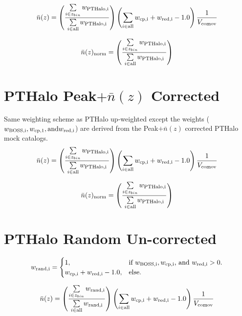 \documentclass[letterpaper]{article}
\begin{document}
\begin{equation}
\bar{n}(z) = \left(\frac{\sum\limits_{i \in z_{bin}} w_{\rm{PTHalo},i} }{\sum\limits_{i \in \rm{all}} w_{\rm{PTHalo},i} } \right) \left(\sum\limits_{i \in \rm{all}} w_{\rm{cp},i} + w_{\rm{red},i}-1.0 \right) \frac{1}{V_{\rm{comov}}}
\end{equation}

\begin{equation}
\bar{n}(z)_{\rm{norm}} = \left(\frac{\sum\limits_{i \in z_{bin}} w_{\rm{PTHalo},i} }{\sum\limits_{i \in \rm{all}} w_{\rm{PTHalo},i} } \right)
\end{equation}

\section{PTHalo Peak$+\bar{n}(z)$ Corrected}
\noindent Same weighting scheme as PTHalo up-weighted except the weights ($w_{\rm{BOSS},i}, w_{\rm{cp},1}, \text{and} w_{\rm{red},i}$) are derived from the Peak$+\bar{n}(z)$ corrected PTHalo mock catalogs. 
\begin{equation}
\bar{n}(z) = \left(\frac{\sum\limits_{i \in z_{bin}} w_{\rm{PTHalo},i} }{\sum\limits_{i \in \rm{all}} w_{\rm{PTHalo},i} } \right) \left(\sum\limits_{i \in \rm{all}} w_{\rm{cp},i} + w_{\rm{red},i}-1.0 \right) \frac{1}{V_{\rm{comov}}}
\end{equation}

\begin{equation}
\bar{n}(z)_{\rm{norm}} = \left(\frac{\sum\limits_{i \in z_{bin}} w_{\rm{PTHalo},i} }{\sum\limits_{i \in \rm{all}} w_{\rm{PTHalo},i} } \right)
\end{equation}

\section{PTHalo Random Un-corrected}
\begin{equation}
w_{\rm{rand},i} = \begin{cases}
    1, & \text{if $w_{\rm{BOSS},i},w_{\rm{cp},i}$, and $w_{\rm{red},i} > 0$.} \\
    w_{\rm{cp},i} + w_{\rm{red},i} - 1.0, & \text{else.} 
    \end{cases}
\end{equation}

\begin{equation}
\bar{n}(z) = \left(\frac{\sum\limits_{i \in z_{bin}} w_{\rm{rand},i} }{\sum\limits_{i \in \rm{all}} w_{\rm{rand},i} } \right) \left(\sum\limits_{i \in \rm{all}} w_{\rm{cp},i} + w_{\rm{red},i}-1.0 \right) \frac{1}{V_{\rm{comov}}}
\end{equation}
\end{document}
